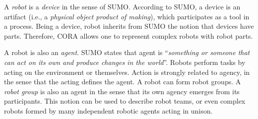 \documentclass[preprint,12pt]{elsarticle}
\begin{document}

A {\it robot} is a {\it device} in the sense of SUMO. According to SUMO, a device is an artifact (i.e., a {\it physical object product of making}), which participates as a tool in a process. Being a device, robot inherits from SUMO the notion that devices have parts. Therefore, CORA allows one to represent complex robots with robot parts.


A robot is also an {\it agent}. SUMO states that agent is ``{\it something or someone that can act on its own and produce changes in the world}''. Robots perform tasks by acting on the environment or themselves. Action is strongly related to agency, in the sense that the acting defines the agent. A robot can form robot groups. A \emph{robot group} is also an agent in the sense that its own agency emerges from its participants. This notion can be used to describe robot teams, or even complex robots formed by many independent robotic agents acting in unison.

\end{document}
